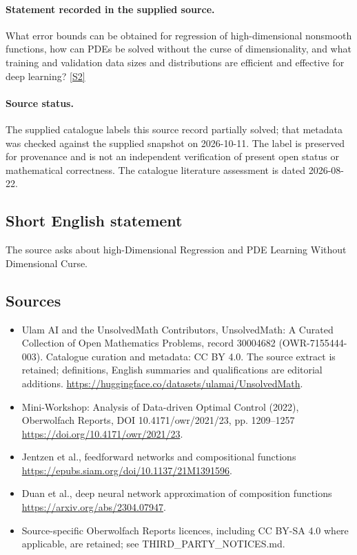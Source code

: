 \documentclass[11pt]{article}
\begin{document}
\paragraph{Statement recorded in the supplied source.}
What error bounds can be obtained for regression of high-dimensional nonsmooth functions, how can PDEs be solved without the curse of dimensionality, and what training and validation data sizes and distributions are efficient and effective for deep learning? \href{https://doi.org/10.4171/owr/2021/23}{[S2]}
\paragraph{Source status.}
The supplied catalogue labels this source record partially solved; that metadata was checked against the supplied snapshot on 2026-10-11. The label is preserved for provenance and is not an independent verification of present open status or mathematical correctness. The catalogue literature assessment is dated 2026-08-22.
\subsection{Short English statement}
The source asks about high-Dimensional Regression and PDE Learning Without Dimensional Curse.
\subsection{Sources}
\begin{itemize}
\item[S1] Ulam AI and the UnsolvedMath Contributors, UnsolvedMath: A Curated Collection of Open Mathematics Problems, record 30004682 (OWR-7155444-003). Catalogue curation and metadata: CC BY 4.0. The source extract is retained; definitions, English summaries and qualifications are editorial additions.
\url{https://huggingface.co/datasets/ulamai/UnsolvedMath}.
\item[S2] Mini-Workshop: Analysis of Data-driven Optimal Control (2022), Oberwolfach Reports, DOI 10.4171/owr/2021/23, pp. 1209--1257
\url{https://doi.org/10.4171/owr/2021/23}.
\item[S3] Jentzen et al., feedforward networks and compositional functions
\url{https://epubs.siam.org/doi/10.1137/21M1391596}.
\item[S4] Duan et al., deep neural network approximation of composition functions
\url{https://arxiv.org/abs/2304.07947}.
\item Source-specific Oberwolfach Reports licences, including CC BY-SA 4.0 where applicable, are retained; see THIRD\_PARTY\_NOTICES.md.
\end{itemize}
\end{document}
